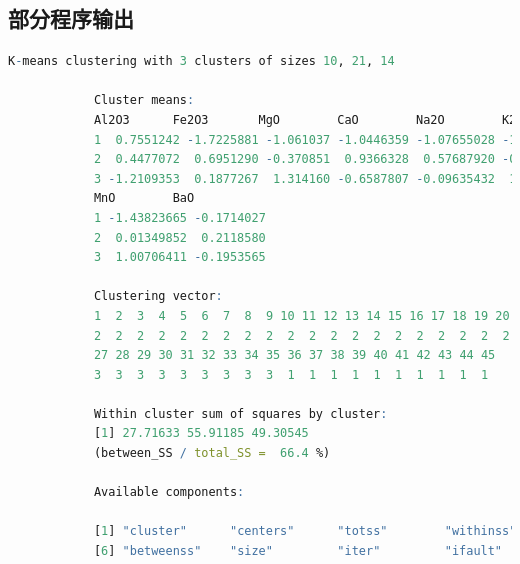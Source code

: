 \documentclass[12pt, a4paper, oneside]{ctexart}
\begin{document}
	\begin{appendices}
		\renewcommand{\thesection}{\Alph{section}}
		\section{部分程序输出}
		\begin{lstlisting}[language=R, caption={K均值聚类结果}, label=lst:Kmean]
			K-means clustering with 3 clusters of sizes 10, 21, 14
			
			Cluster means:
			Al2O3      Fe2O3       MgO        CaO        Na2O        K2O       TiO2
			1  0.7551242 -1.7225881 -1.061037 -1.0446359 -1.07655028 -1.3826254  0.7971355
			2  0.4477072  0.6951290 -0.370851  0.9366328  0.57687920 -0.1139204  0.3389812
			3 -1.2109353  0.1877267  1.314160 -0.6587807 -0.09635432  1.1584702 -1.0778543
			MnO        BaO
			1 -1.43823665 -0.1714027
			2  0.01349852  0.2118580
			3  1.00706411 -0.1953565
			
			Clustering vector:
			1  2  3  4  5  6  7  8  9 10 11 12 13 14 15 16 17 18 19 20 21 22 23 24 25 26
			2  2  2  2  2  2  2  2  2  2  2  2  2  2  2  2  2  2  2  2  2  3  3  3  3  3
			27 28 29 30 31 32 33 34 35 36 37 38 39 40 41 42 43 44 45
			3  3  3  3  3  3  3  3  3  1  1  1  1  1  1  1  1  1  1 
			
			Within cluster sum of squares by cluster:
			[1] 27.71633 55.91185 49.30545
			(between_SS / total_SS =  66.4 %)
			
			Available components:
			
			[1] "cluster"      "centers"      "totss"        "withinss"     "tot.withinss"
			[6] "betweenss"    "size"         "iter"         "ifault"
		\end{lstlisting}
	\end{appendices}
	
\end{document}
